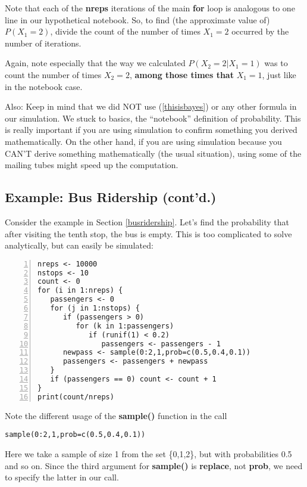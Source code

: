 Note that each of the {\bf nreps} iterations of the main {\bf for} loop
is analogous to one line in our hypothetical notebook.  So, to find
(the approximate value of) $P(X_1 = 2)$, divide the count of the number
of times $X_1 = 2$ occurred by the number of iterations.

Again, note especially that the way we calculated $P(X_2 = 2 | X_1 = 1)$
was to count the number of times $X_2 = 2$, {\bf among those times that}
$X_1 = 1$, just like in the notebook case.

Also:  Keep in mind that we did NOT use (\ref{thisisbayes}) or any other
formula in our simulation.  We stuck to basics, the ``notebook''
definition of probability.  This is really important if you are using
simulation to confirm something you derived mathematically.  On the
other hand, if you are using simulation because you CAN'T derive
something mathematically (the usual situation), using some of the
mailing tubes might speed up the computation.

\subsection{Example:  Bus Ridership (cont'd.)}
\label{busridershipsim}

Consider the example in Section \ref{busridership}.  Let's find the
probability that after visiting the tenth stop, the bus is empty.  This
is too complicated to solve analytically, but can easily be simulated:

\begin{Verbatim}[fontsize=\relsize{-2},numbers=left]
nreps <- 10000
nstops <- 10
count <- 0
for (i in 1:nreps) {
   passengers <- 0
   for (j in 1:nstops) {
      if (passengers > 0) 
         for (k in 1:passengers) 
            if (runif(1) < 0.2) 
               passengers <- passengers - 1
      newpass <- sample(0:2,1,prob=c(0.5,0.4,0.1))
      passengers <- passengers + newpass
   }
   if (passengers == 0) count <- count + 1
}
print(count/nreps)
\end{Verbatim}

Note the different usage of the {\bf sample()} function in the call

\begin{Verbatim}[fontsize=\relsize{-2}]
sample(0:2,1,prob=c(0.5,0.4,0.1))
\end{Verbatim}

Here we take a sample of size 1 from the set \{0,1,2\}, but with
probabilities 0.5 and so on.  Since the third argument for {\bf
sample()} is {\bf replace}, not {\bf prob}, we need to specify the
latter in our call.

